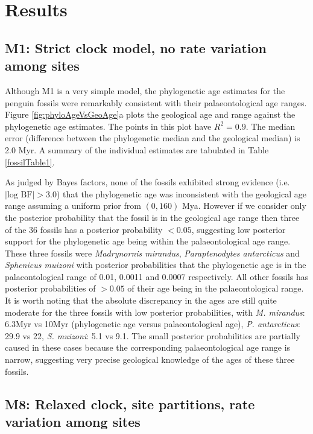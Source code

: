 \documentclass[11pt]{article}
\newcommand{\Mstrict}{{M1}}
\newcommand{\Mrelaxed}{{M8}}
\begin{document}
\section*{Results}


\subsection*{\Mstrict{}: Strict clock model, no rate variation among sites}
Although \Mstrict{} is a very simple model, the phylogenetic age estimates for the penguin fossils were remarkably consistent with their palaeontological age ranges. Figure \ref{fig:phyloAgeVsGeoAge}a plots the geological age and range against the phylogenetic age estimates. The points in this plot have $R^2 = 0.9$. The median error (difference between the phylogenetic median and the geological median) is 2.0 Myr. A summary of the individual estimates are tabulated in Table \ref{fossilTable1}.

As judged by Bayes factors, none of the fossils exhibited strong evidence (i.e. $|\text{log BF}| > 3.0$) that the phylogenetic age was inconsistent with the geological age range assuming a uniform prior from $(0,160)$ Mya. However if we consider only the posterior probability that the fossil is in the geological age range then three of the 36 fossils has a posterior probability $< 0.05$, suggesting low posterior support for the phylogenetic age being within the palaeontological age range. These three fossils were {\em Madrynornis mirandus}, {\em Paraptenodytes antarcticus} and {\em Sphenicus muizoni} with posterior probabilities that the phylogenetic age is in the palaeontological range of 0.01, 0.0011 and 0.0007 respectively. All other fossils has posterior probabilities of $> 0.05$ of their age being in the palaeontological range. It is worth noting that the absolute discrepancy in the ages are still quite moderate for the three fossils with low posterior probabilities, with {\em M. mirandus}: 6.3Myr vs 10Myr (phylogenetic age versus palaeontological age), {\em P. antarcticus}: 29.9 vs 22, {\em S. muizoni}: 5.1 vs 9.1. The small posterior probabilities are partially caused in these cases because the corresponding palaeontological age range is narrow, suggesting very precise geological knowledge of the ages of these three fossils.

\subsection*{\Mrelaxed{}: Relaxed clock, site partitions, rate variation among sites}
\end{document}
